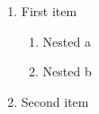 \documentclass{article}
\begin{document}
\begin{enumerate}
\item First item
\begin{enumerate}
\item Nested a
\item Nested b
\end{enumerate}
\item Second item
\end{enumerate}
\end{document}
